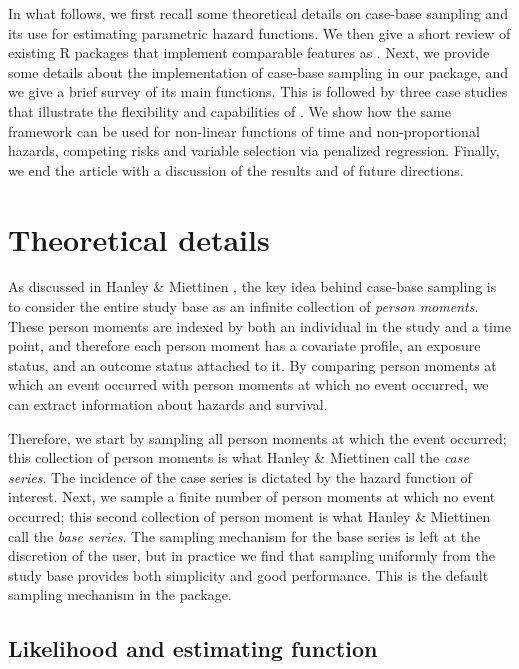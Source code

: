 In what follows, we first recall some theoretical details on case-base
sampling and its use for estimating parametric hazard functions. We then
give a short review of existing R packages that implement comparable
features as . Next, we provide some details about the
implementation of case-base sampling in our package, and we give a brief
survey of its main functions. This is followed by three case studies
that illustrate the flexibility and capabilities of . We
show how the same framework can be used for non-linear functions of time
and non-proportional hazards, competing risks and variable selection via
penalized regression. Finally, we end the article with a discussion of
the results and of future directions.

\hypertarget{theory}{%
\section{Theoretical details}\label{theory}}

As discussed in Hanley \& Miettinen \citeyearpar{hanley2009fitting}, the
key idea behind case-base sampling is to consider the entire study base
as an infinite collection of \emph{person moments}. These person moments
are indexed by both an individual in the study and a time point, and
therefore each person moment has a covariate profile, an exposure
status, and an outcome status attached to it. By comparing person
moments at which an event occurred with person moments at which no event
occurred, we can extract information about hazards and survival.

Therefore, we start by sampling all person moments at which the event
occurred; this collection of person moments is what Hanley \& Miettinen
call the \emph{case series}. The incidence of the case series is
dictated by the hazard function of interest. Next, we sample a finite
number of person moments at which no event occurred; this second
collection of person moment is what Hanley \& Miettinen call the
\emph{base series}. The sampling mechanism for the base series is left
at the discretion of the user, but in practice we find that sampling
uniformly from the study base provides both simplicity and good
performance. This is the default sampling mechanism in the package.

\hypertarget{likelihood-and-estimating-function}{%
\subsection{Likelihood and estimating
function}\label{likelihood-and-estimating-function}}

